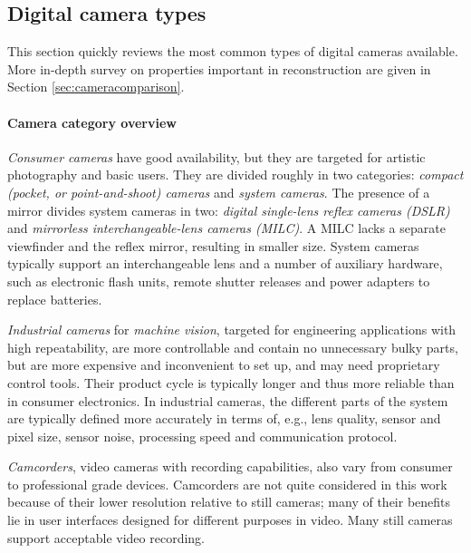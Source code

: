 
\subsection{Digital camera types} \label{sec:cameratypes} %


This section quickly reviews the most common types of digital cameras available.
More in-depth survey on properties important in reconstruction are given in Section \ref{sec:cameracomparison}.
%

\paragraph{Camera category overview}
\emph{Consumer cameras} have good availability, but they are targeted for artistic photography and basic users.
They are divided roughly in two categories: \emph{compact (pocket, or point-and-shoot) cameras} and \emph{system cameras}.
The presence of a mirror divides system cameras in two: \emph{digital single-lens reflex cameras (DSLR)} and \emph{mirrorless interchangeable-lens cameras (MILC)}.
A MILC lacks a separate viewfinder and the reflex mirror, resulting in smaller size.
System cameras typically support an interchangeable lens and a number of auxiliary hardware, such as electronic flash units, remote shutter releases and power adapters to replace batteries.

\emph{Industrial cameras} for \emph{machine vision}, targeted for engineering applications with high repeatability, are more controllable and contain no unnecessary bulky parts, but are more expensive and inconvenient to set up, and may need proprietary control tools.
Their product cycle is typically longer and thus more reliable than in consumer electronics.
In industrial cameras, the different parts of the system are typically defined more accurately in terms of, e.g., lens quality, sensor and pixel size, sensor noise, processing speed and communication protocol.

\emph{Camcorders}, video cameras with recording capabilities, also vary from consumer to professional grade devices.
Camcorders are not quite considered in this work because of their lower resolution relative to still cameras; many of their benefits lie in user interfaces designed for different purposes in video.
Many still cameras support acceptable video recording.

